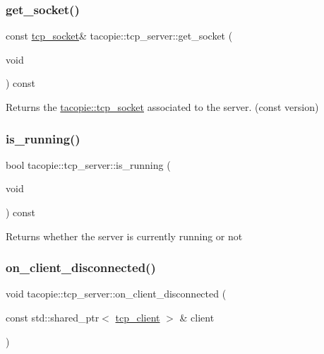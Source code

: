\subsubsection{\texorpdfstring{get\+\_\+socket()}{get\_socket()}\hspace{0.1cm}{\footnotesize\ttfamily [2/2]}}
{\footnotesize\ttfamily const \hyperlink{classtacopie_1_1tcp__socket}{tcp\+\_\+socket}\& tacopie\+::tcp\+\_\+server\+::get\+\_\+socket (\begin{DoxyParamCaption}\item[{void}]{ }\end{DoxyParamCaption}) const}

\begin{DoxyReturn}{Returns}
the \hyperlink{classtacopie_1_1tcp__socket}{tacopie\+::tcp\+\_\+socket} associated to the server. (const version) 
\end{DoxyReturn}
\mbox{\label{classtacopie_1_1tcp__server_a76162141e6443953f3ad8e11c4e4d3d7}} 
\subsubsection{\texorpdfstring{is\+\_\+running()}{is\_running()}}
{\footnotesize\ttfamily bool tacopie\+::tcp\+\_\+server\+::is\+\_\+running (\begin{DoxyParamCaption}\item[{void}]{ }\end{DoxyParamCaption}) const}

\begin{DoxyReturn}{Returns}
whether the server is currently running or not 
\end{DoxyReturn}
\mbox{\label{classtacopie_1_1tcp__server_ad98bdefae28be6b16a213bf5bedbf7d9}} 
\subsubsection{\texorpdfstring{on\+\_\+client\+\_\+disconnected()}{on\_client\_disconnected()}}
{\footnotesize\ttfamily void tacopie\+::tcp\+\_\+server\+::on\+\_\+client\+\_\+disconnected (\begin{DoxyParamCaption}\item[{const std\+::shared\+\_\+ptr$<$ \hyperlink{classtacopie_1_1tcp__client}{tcp\+\_\+client} $>$ \&}]{client }\end{DoxyParamCaption})\hspace{0.3cm}{\ttfamily [private]}}

